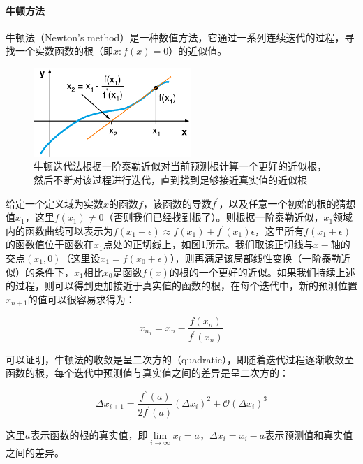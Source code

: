 \paragraph{牛顿方法}
牛顿法（Newton's method）是一种数值方法，它通过一系列连续迭代的过程，寻找一个实数函数的根（即$x:f(x)=0$）的近似值。

\begin{figure}
	\sidecaption
	\includegraphics[width=0.53\textwidth]{figures/mlt/Newton-method}
	\caption{牛顿迭代法根据一阶泰勒近似对当前预测根计算一个更好的近似根，然后不断对该过程进行迭代，直到找到足够接近真实值的近似根}
	\label{f:mlt-Newton-method}
\end{figure}

给定一个定义域为实数$x$的函数$f$，该函数的导数$f^{'}$，以及任意一个初始的根的猜想值$x_1$，这里$f(x_1)\neq 0$（否则我们已经找到根了）。则根据一阶泰勒近似，$x_1$领域内的函数曲线可以表示为$f(x_1+\epsilon)\approx f(x_1)+f^{'}(x_1)\epsilon$，这里所有$f(x_1+\epsilon)$的函数值位于函数在$x_1$点处的正切线上，如图\ref{f:mlt-Newton-method}所示。我们取该正切线与$x-$轴的交点$(x_1,0)$（这里设$x_1=f(x_0+\epsilon)$），则再满足该局部线性变换（一阶泰勒近似）的条件下，$x_1$相比$x_0$是函数$f(x)$的根的一个更好的近似。如果我们持续上述的过程，则可以得到更加接近于真实值的函数的根，在每个迭代中，新的预测位置$x_{n+1}$的值可以很容易求得为：

\begin{equation}
	x_{n_1}=x_n-\frac{f(x_n)}{f^{'}(x_n)}
\end{equation}

\noindent 可以证明，牛顿法的收敛是呈二次方的（quadratic），即随着迭代过程逐渐收敛至函数的根，每个迭代中预测值与真实值之间的差异是呈二次方的：

\begin{equation}
	\Delta x_{i+1}=\frac{f^{''}(a)}{2f^{'}(a)}(\Delta x_i)^{2}+\mathcal{O}(\Delta x_i)^{3}
\end{equation}

\noindent 这里$a$表示函数的根的真实值，即$\lim\limits_{i\to\infty}x_i=a$，$\Delta x_i=x_i-a$表示预测值和真实值之间的差异。

